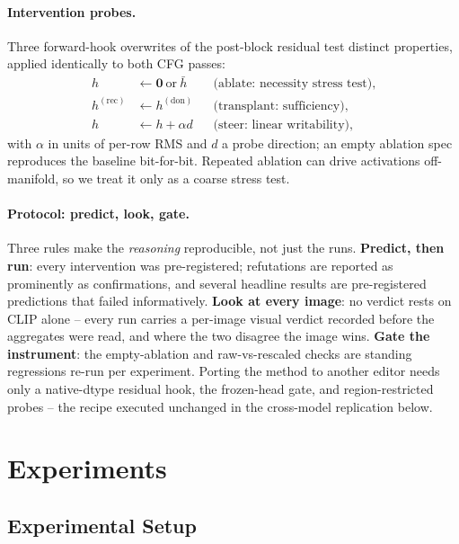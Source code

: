 \documentclass[letterpaper]{article} %
\begin{document}
\paragraph{Intervention probes.}
Three forward-hook overwrites of the post-block residual test distinct
properties, applied identically to both CFG passes:
\begin{align}
  h &\leftarrow \mathbf{0}\ \text{or}\ \bar{h}
  && \text{(ablate: necessity stress test)}, \nonumber \\
  h^{(\mathrm{rec})} &\leftarrow h^{(\mathrm{don})}
  && \text{(transplant: sufficiency)}, \nonumber \\
  h &\leftarrow h + \alpha d
  && \text{(steer: linear writability)},
  \label{eq:interventions}
\end{align}
with $\alpha$ in units of per-row RMS and $d$ a probe direction; an empty
ablation spec reproduces the baseline bit-for-bit. Repeated ablation can
drive activations off-manifold, so we treat it only as a coarse stress test.

\paragraph{Protocol: predict, look, gate.} Three rules make the
\emph{reasoning} reproducible, not just the runs. \textbf{Predict, then
run}: every intervention was pre-registered; refutations are reported as
prominently as confirmations, and several headline results are
pre-registered predictions that failed informatively. \textbf{Look at
every image}: no verdict rests on CLIP alone -- every run carries a
per-image visual verdict recorded before the aggregates were read, and
where the two disagree the image wins. \textbf{Gate the instrument}: the
empty-ablation and raw-vs-rescaled checks are standing regressions re-run
per experiment. Porting the method to another editor needs only a
native-dtype residual hook, the frozen-head gate, and region-restricted
probes -- the recipe executed unchanged in the cross-model replication
below.

\section{Experiments}\label{sec:experiments}

\subsection{Experimental Setup}\label{sec:setup}
\end{document}
